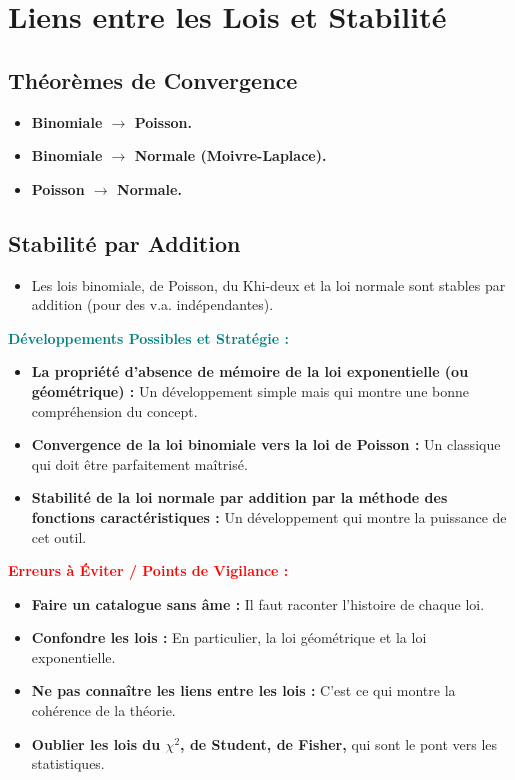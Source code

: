\documentclass[12pt, a4paper, parskip=full]{report}
\theoremstyle{agregstyle}
\newenvironment{developpements}
  {\par\medskip\noindent\begin{oframed}\noindent\textbf{\textcolor{teal}{Développements Possibles et Stratégie :}}}
  {\end{oframed}\par\medskip}
\newenvironment{erreurs}
  {\par\medskip\noindent\begin{oframed}\noindent\textbf{\textcolor{red}{Erreurs à Éviter / Points de Vigilance :}}}
  {\end{oframed}\par\medskip}
\begin{document}
\section{Liens entre les Lois et Stabilité}
\subsection{Théorèmes de Convergence}
\begin{itemize}
    \item \textbf{Binomiale $\to$ Poisson.}
    \item \textbf{Binomiale $\to$ Normale (Moivre-Laplace).}
    \item \textbf{Poisson $\to$ Normale.}
\end{itemize}
\subsection{Stabilité par Addition}
\begin{itemize}
    \item Les lois binomiale, de Poisson, du Khi-deux et la loi normale sont stables par addition (pour des v.a. indépendantes).
\end{itemize}

\begin{developpements}
    \begin{itemize}
        \item \textbf{La propriété d'absence de mémoire de la loi exponentielle (ou géométrique) :} Un développement simple mais qui montre une bonne compréhension du concept.
        \item \textbf{Convergence de la loi binomiale vers la loi de Poisson :} Un classique qui doit être parfaitement maîtrisé.
        \item \textbf{Stabilité de la loi normale par addition par la méthode des fonctions caractéristiques :} Un développement qui montre la puissance de cet outil.
    \end{itemize}
\end{developpements}

\begin{erreurs}
    \begin{itemize}
        \item \textbf{Faire un catalogue sans âme :} Il faut raconter l'histoire de chaque loi.
        \item \textbf{Confondre les lois :} En particulier, la loi géométrique et la loi exponentielle.
        \item \textbf{Ne pas connaître les liens entre les lois :} C'est ce qui montre la cohérence de la théorie.
        \item \textbf{Oublier les lois du $\chi^2$, de Student, de Fisher,} qui sont le pont vers les statistiques.
    \end{itemize}
\end{erreurs}
\end{document}

